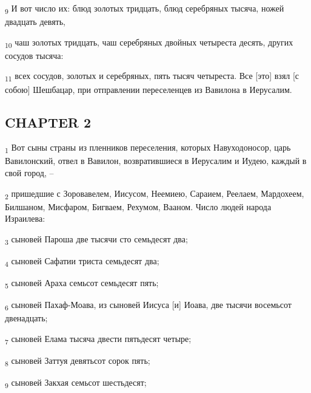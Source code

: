 \begin{tcolorbox}
\textsubscript{9} И вот число их: блюд золотых тридцать, блюд серебряных тысяча, ножей двадцать девять,
\end{tcolorbox}
\begin{tcolorbox}
\textsubscript{10} чаш золотых тридцать, чаш серебряных двойных четыреста десять, других сосудов тысяча:
\end{tcolorbox}
\begin{tcolorbox}
\textsubscript{11} всех сосудов, золотых и серебряных, пять тысяч четыреста. Все [это] взял [с собою] Шешбацар, при отправлении переселенцев из Вавилона в Иерусалим.
\end{tcolorbox}
\subsection{CHAPTER 2}
\begin{tcolorbox}
\textsubscript{1} Вот сыны страны из пленников переселения, которых Навуходоносор, царь Вавилонский, отвел в Вавилон, возвратившиеся в Иерусалим и Иудею, каждый в свой город, --
\end{tcolorbox}
\begin{tcolorbox}
\textsubscript{2} пришедшие с Зоровавелем, Иисусом, Неемиею, Сараием, Реелаем, Мардохеем, Билшаном, Мисфаром, Бигваем, Рехумом, Вааном. Число людей народа Израилева:
\end{tcolorbox}
\begin{tcolorbox}
\textsubscript{3} сыновей Пароша две тысячи сто семьдесят два;
\end{tcolorbox}
\begin{tcolorbox}
\textsubscript{4} сыновей Сафатии триста семьдесят два;
\end{tcolorbox}
\begin{tcolorbox}
\textsubscript{5} сыновей Араха семьсот семьдесят пять;
\end{tcolorbox}
\begin{tcolorbox}
\textsubscript{6} сыновей Пахаф-Моава, из сыновей Иисуса [и] Иоава, две тысячи восемьсот двенадцать;
\end{tcolorbox}
\begin{tcolorbox}
\textsubscript{7} сыновей Елама тысяча двести пятьдесят четыре;
\end{tcolorbox}
\begin{tcolorbox}
\textsubscript{8} сыновей Заттуя девятьсот сорок пять;
\end{tcolorbox}
\begin{tcolorbox}
\textsubscript{9} сыновей Закхая семьсот шестьдесят;
\end{tcolorbox}
